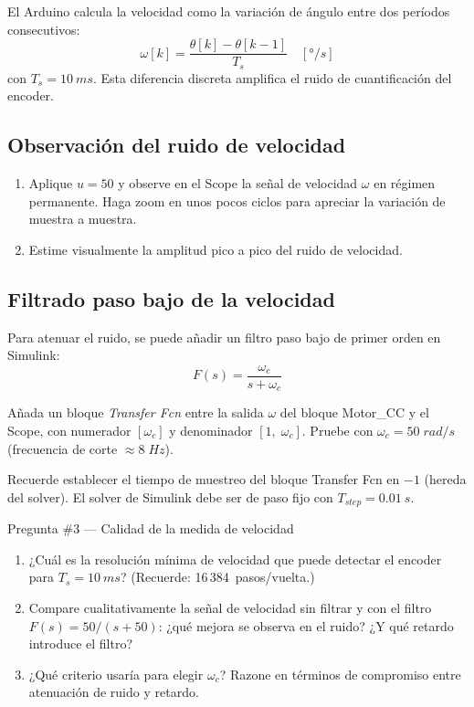 \documentclass[12pt,a4paper]{article}
\begin{document}
El Arduino calcula la velocidad como la variación de ángulo entre dos períodos consecutivos:
\begin{equation}
  \omega[k] = \frac{\theta[k] - \theta[k-1]}{T_s} \quad [\si{\degree/s}]
  \label{eq:vel_discreta}
\end{equation}
con $T_s = \SI{10}{ms}$. Esta diferencia discreta amplifica el ruido de cuantificación del encoder.

\subsection{Observación del ruido de velocidad}

\begin{enumerate}
  \item Aplique $u = 50$ y observe en el Scope la señal de velocidad $\omega$ en
        régimen permanente. Haga zoom en unos pocos ciclos para apreciar la
        variación de muestra a muestra.
  \item Estime visualmente la amplitud pico a pico del ruido de velocidad.
\end{enumerate}

\subsection{Filtrado paso bajo de la velocidad}

Para atenuar el ruido, se puede añadir un filtro paso bajo de primer orden en Simulink:
\begin{equation}
  F(s) = \frac{\omega_c}{s + \omega_c}
  \label{eq:filtro}
\end{equation}

Añada un bloque \emph{Transfer Fcn} entre la salida $\omega$ del bloque Motor\_CC
y el Scope, con numerador $[\omega_c]$ y denominador $[1,\;\omega_c]$.
Pruebe con $\omega_c = 50\;\si{rad/s}$ (frecuencia de corte $\approx 8\;\si{Hz}$).

\begin{notabox}
  Recuerde establecer el tiempo de muestreo del bloque Transfer Fcn en $-1$
  (hereda del solver). El solver de Simulink debe ser de paso fijo con
  $T_{step} = \SI{0.01}{s}$.
\end{notabox}

\begin{pregunta}{Pregunta \#3 — Calidad de la medida de velocidad}
  \begin{enumerate}[label=\alph*)]
    \item ¿Cuál es la resolución mínima de velocidad que puede detectar el encoder
          para $T_s = \SI{10}{ms}$? (Recuerde: 16\,384~pasos/vuelta.)
    \item Compare cualitativamente la señal de velocidad sin filtrar y con el filtro
          $F(s)=50/(s+50)$: ¿qué mejora se observa en el ruido? ¿Y qué retardo
          introduce el filtro?
    \item ¿Qué criterio usaría para elegir $\omega_c$? Razone en términos de
          compromiso entre atenuación de ruido y retardo.
  \end{enumerate}
\end{pregunta}
\end{document}
